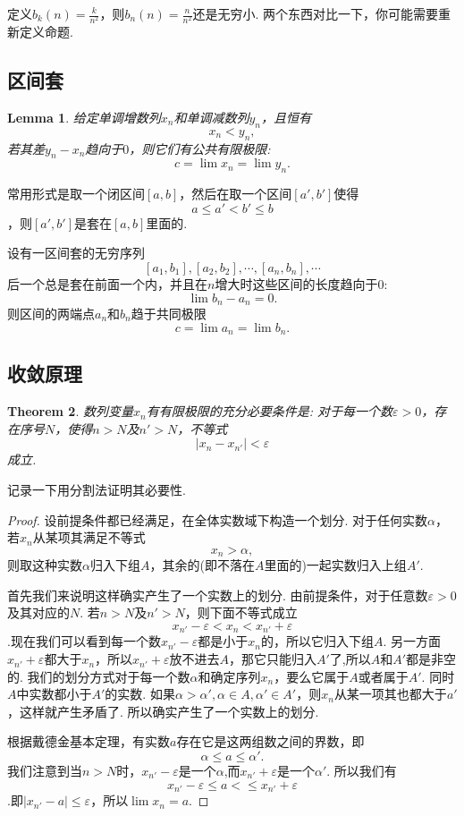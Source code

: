 \documentclass{article}
\newtheorem{theorem}{Theorem}[section]
\newtheorem{lemma}[theorem]{Lemma}
\begin{document}
定义$b_k(n)=\frac k{n^2}$，则$b_n(n)=\frac n{n^2}$还是无穷小. 两个东西对比一下，你可能需要重新定义命题.


\newpage
\subsection{区间套}

\begin{lemma}
给定单调增数列$x_n$和单调减数列$y_n$，且恒有\[x_n < y_n,\]若其差$y_n - x_n$趋向于$0$，则它们有公共有限极限:\[c = \lim x_n  = \lim y_n.\]
\end{lemma}

常用形式是取一个闭区间$[a,b]$，然后在取一个区间$[a',b']$使得\[a \leq a' < b' \leq b\]，则$[a',b']$是套在$[a,b]$里面的.

设有一区间套的无穷序列\[[a_1,b_1],[a_2,b_2],\cdots,[a_n,b_n],\cdots\]后一个总是套在前面一个内，并且在$n$增大时这些区间的长度趋向于$0$:\[\lim b_n - a_n = 0.\]则区间的两端点$a_n$和$b_n$趋于共同极限\[c = \lim a_n = \lim b_n.\]


\newpage
\subsection{收敛原理}

\begin{theorem}
数列变量$x_n$有有限极限的充分必要条件是: 对于每一个数$\varepsilon > 0$，存在序号$N$，使得$n > N$及$n' > N$，不等式\[|x_n - x_{n'}| < \varepsilon\]成立.
\end{theorem}

记录一下用分割法证明其必要性.
\begin{proof}
设前提条件都已经满足，在全体实数域下构造一个划分. 对于任何实数$\alpha$，若$x_n$从某项其满足不等式\[x_n > \alpha,\]则取这种实数$\alpha$归入下组$A$，其余的(即不落在$A$里面的)一起实数归入上组$A'$.

首先我们来说明这样确实产生了一个实数上的划分. 由前提条件，对于任意数$\varepsilon>0$及其对应的$N$. 若$n > N$及$n' > N$，则下面不等式成立\[x_{n'} - \varepsilon < x_n < x_{n'}+\varepsilon\].现在我们可以看到每一个数$x_{n'} - \varepsilon$都是小于$x_n$的，所以它归入下组$A$. 另一方面$x_{n'}+\varepsilon$都大于$x_n$，所以$x_{n'}+\varepsilon$放不进去$A$，那它只能归入$A'$了,所以$A$和$A'$都是非空的. 我们的划分方式对于每一个数$\alpha$和确定序列$x_n$，要么它属于$A$或者属于$A'$. 同时$A$中实数都小于$A'$的实数. 如果$\alpha > \alpha', \alpha \in A , \alpha' \in A'$，则$x_n$从某一项其也都大于$a'$，这样就产生矛盾了. 所以确实产生了一个实数上的划分.

根据戴德金基本定理，有实数$a$存在它是这两组数之间的界数，即\[\alpha \leq a \leq \alpha'.\]我们注意到当$n > N$时，$x_{n'} - \varepsilon$是一个$\alpha$,而$x_{n'} +\varepsilon$是一个$\alpha'$. 所以我们有\[x_{n'} - \varepsilon \leq a < \leq x_{n'} + \varepsilon\].即$|x_{n'}-a| \leq \varepsilon$，所以$\lim x_n = a$.
\end{proof}
\end{document}

